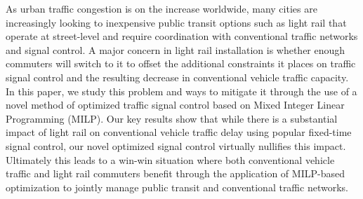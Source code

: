 As urban traffic congestion is on the increase worldwide, many cities are
increasingly looking to inexpensive public transit options such as light rail
that operate at street-level and require coordination with conventional traffic
networks and signal control. A major concern in light rail installation is
whether enough commuters will switch to it to offset the additional constraints
it places on traffic signal control and the resulting decrease in conventional
vehicle traffic capacity. In this paper, we study this problem and ways to
mitigate it through the use of a novel method of optimized traffic signal
control based on Mixed Integer Linear Programming (MILP). Our key results show
that while there is a substantial impact of light rail on conventional vehicle
traffic delay using popular fixed-time signal control, our novel optimized
signal control virtually nullifies this impact. Ultimately this leads to a
win-win situation where both conventional vehicle traffic and light rail
commuters benefit through the application of MILP-based optimization to jointly
manage public transit and conventional traffic networks.
